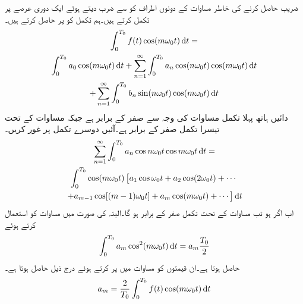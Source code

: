  ضریب   حاصل کرنے کی خاطر مساوات  کے دونوں اطراف کو  سے ضرب دیتے ہوئے ایک دوری عرصے پر تکمل کرتے ہیں۔ہم تکمل کو  پر حاصل کرتے ہیں۔
\begin{multline}\label{مساوات_فوریئر_عددی_سر_کا_حصول_الف}
\int_0^{T_0}f(t) \cos( m \omega_0 t) \dif t=\\
\int_0^{T_0} a_0 \cos (m\omega_0 t) \dif t+\sum_{n=1}^{\infty}  \int_0^{T_0} a_n\cos (n \omega_0 t)  \cos (m \omega_0 t) \dif t \\
+\sum_{n=1}^{\infty} \int_0^{T_0} b_n \sin (n \omega_0 t) \cos (m\omega_0 t) \dif t
\end{multline}
دائیں ہاتھ پہلا تکمل مساوات  کی وجہ سے صفر کے برابر ہے جبکہ مساوات  کے تحت تیسرا تکمل صفر کے برابر ہے۔آئیں دوسرے تکمل پر غور کریں۔
\begin{multline*}
\sum_{n=1}^{\infty}  \int_0^{T_0} a_n\cos n \omega_0 t  \cos m \omega_0 t \dif t =\\
\int_0^{T_0} \cos (m\omega_0 t)\left[a_1 \cos \omega_0 t+a_2\cos (2\omega_0 t)+\cdots \right.\\
\left.+a_{m-1}\cos[(m-1)\omega_0 t]+a_m\cos(m\omega_0 t)+\cdots \right] \dif t
\end{multline*}
اب اگر  ہو تب مساوات  کے تحت تکمل صفر کے برابر ہو گا۔البتہ  کی صورت میں مساوات  کو استعمال کرتے ہوئے
\begin{align*}
\int_0^{T_0}a_m \cos^2 (m\omega_0 t) \dif t=a_m\frac{T_0}{2}
\end{align*} 
حاصل ہوتا ہے۔ان قیمتوں کو مساوات  میں پر کرتے ہوئے درج ذیل حاصل ہوتا ہے۔
\begin{align}\label{مساوات_فوریئر_عددی_سر_ب}
a_m=\frac{2}{T_0}\int_0^{T_0}f(t) \cos (m \omega_0 t) \dif t
\end{align}

